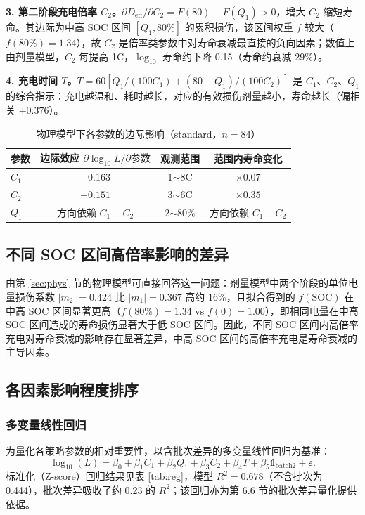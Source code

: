\documentclass[withoutpreface]{cumcmthesis}
\begin{document}
\textbf{3. 第二阶段充电倍率 $C_2$。}$\partial D_{\mathrm{eff}}/\partial C_2=F(80)-F(Q_1)>0$，增大 $C_2$ 缩短寿命。其边际为中高 SOC 区间 $[Q_1,80\%]$ 的累积损伤，该区间权重 $f$ 较大（$f(80\%)=1.34$），故 $C_2$ 是倍率类参数中对寿命衰减最直接的负向因素；数值上由剂量模型，$C_2$ 每提高 1C，$\log_{10}$ 寿命约下降 0.15（寿命约衰减 29\%）。

\textbf{4. 充电时间 $T$。}$T=60\left[Q_1/(100C_1)+(80-Q_1)/(100C_2)\right]$ 是 $C_1$、$C_2$、$Q_1$ 的综合指示：充电越温和、耗时越长，对应的有效损伤剂量越小，寿命越长（偏相关 $+0.376$）。

\begin{table}[htbp]
\centering
\caption{物理模型下各参数的边际影响（standard，$n=84$）}
\label{tab:marginal}
\begin{tabular}{lccc}
\toprule
参数 & 边际效应 $\partial\log_{10}L/\partial\text{参数}$ & 观测范围 & 范围内寿命变化 \\
\midrule
$C_1$ & $-0.163$ & 1$\sim$8C & $\times0.07$ \\
$C_2$ & $-0.151$ & 3$\sim$6C & $\times0.35$ \\
$Q_1$ & 方向依赖 $C_1-C_2$ & 2$\sim$80\% & 方向依赖 $C_1-C_2$ \\
\bottomrule
\end{tabular}
\end{table}

\subsection{不同 SOC 区间高倍率影响的差异}

由第 \ref{sec:phys} 节的物理模型可直接回答这一问题：剂量模型中两个阶段的单位电量损伤系数 $|m_2|=0.424$ 比 $|m_1|=0.367$ 高约 16\%，且拟合得到的 $f(\mathrm{SOC})$ 在中高 SOC 区间显著更高（$f(80\%)=1.34$ vs $f(0)=1.00$），即相同电量在中高 SOC 区间造成的寿命损伤显著大于低 SOC 区间。因此，不同 SOC 区间内高倍率充电对寿命衰减的影响存在显著差异，中高 SOC 区间的高倍率充电是寿命衰减的主导因素。

\subsection{各因素影响程度排序}\label{sec:imp}
\subsubsection{多变量线性回归}
为量化各策略参数的相对重要性，以含批次差异的多变量线性回归为基准：
\begin{equation}\label{eq:reg}
\log_{10}(L) = \beta_0 + \beta_1 C_1 + \beta_2 Q_1 + \beta_3 C_2 + \beta_4 T + \beta_5 \mathbb{1}_{\mathrm{batch2}} + \varepsilon.
\end{equation}
标准化（Z-score）回归结果见表 \ref{tab:reg}，模型 $R^2=0.678$（不含批次为 0.444），批次差异吸收了约 0.23 的 $R^2$；该回归亦为第 6.6 节的批次差异量化提供依据。
\end{document}
